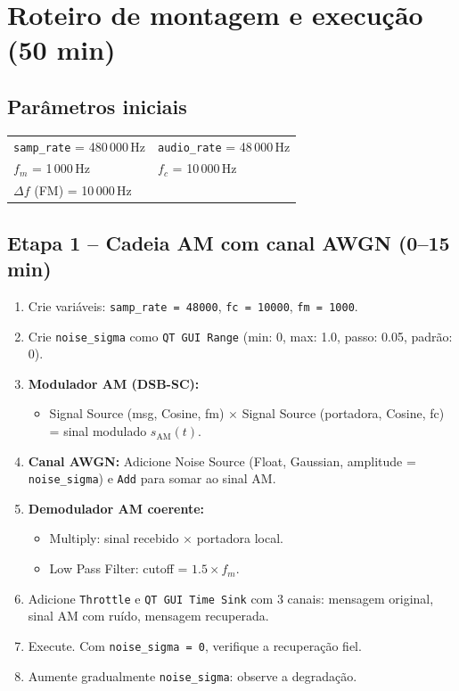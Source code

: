 \documentclass[11pt,a4paper]{article}
\begin{document}
\section{Roteiro de montagem e execução (50 min)}

\subsection*{Parâmetros iniciais}

\begin{center}
\begin{tabular}{l l}
  \texttt{samp\_rate} = 480\,000\,Hz & \texttt{audio\_rate} = 48\,000\,Hz \\
  $f_m$ = 1\,000\,Hz & $f_c$ = 10\,000\,Hz \\
  $\Delta f$ (FM) = 10\,000\,Hz & \\
\end{tabular}
\end{center}

\subsection*{Etapa 1 -- Cadeia AM com canal AWGN (0--15 min)}

\begin{instrucao}
\begin{enumerate}[label=\arabic*.]
  \item Crie variáveis: \texttt{samp\_rate = 48000}, \texttt{fc = 10000},
    \texttt{fm = 1000}.
  \item Crie \texttt{noise\_sigma} como \texttt{QT GUI Range}
    (min: 0, max: 1.0, passo: 0.05, padrão: 0).
  \item \textbf{Modulador AM (DSB-SC):}
    \begin{itemize}
      \item Signal Source (msg, Cosine, fm) $\times$ Signal Source
        (portadora, Cosine, fc) = sinal modulado $s_\text{AM}(t)$.
    \end{itemize}
  \item \textbf{Canal AWGN:}
    Adicione Noise Source (Float, Gaussian, amplitude = \texttt{noise\_sigma})
    e \texttt{Add} para somar ao sinal AM.
  \item \textbf{Demodulador AM coerente:}
    \begin{itemize}
      \item Multiply: sinal recebido $\times$ portadora local.
      \item Low Pass Filter: cutoff = $1.5 \times f_m$.
    \end{itemize}
  \item Adicione \texttt{Throttle} e \texttt{QT GUI Time Sink} com 3 canais:
    mensagem original, sinal AM com ruído, mensagem recuperada.
  \item Execute. Com \texttt{noise\_sigma = 0}, verifique a recuperação fiel.
  \item Aumente gradualmente \texttt{noise\_sigma}: observe a degradação.
\end{enumerate}
\end{instrucao}
\end{document}
